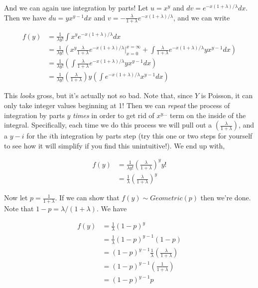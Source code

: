\documentclass[
  letterpaper,
  DIV=11,
  numbers=noendperiod]{scrreprt}
\begin{document}
And we can again use integration by parts! Let \(u = x^y\) and
\(dv = e^{-x(1 + \lambda)/\lambda} dx\). Then we have
\(du = yx^{y-1} dx\) and
\(v = -\frac{\lambda}{1 + \lambda}e^{-x(1 + \lambda)/\lambda}\), and we
can write

\begin{align*}
    f(y) & = \frac{1}{\lambda y!} \int x^y e^{-x(1 + \lambda)/\lambda} dx \\
    & = \frac{1}{\lambda y!} \left( x^y \frac{\lambda}{1 + \lambda}e^{-x(1 + \lambda)/\lambda} \bigg|_{x = 0}^{x = \infty}  + \int \frac{\lambda}{1 + \lambda}e^{-x(1 + \lambda)/\lambda} yx^{y-1} dx\right) \\
    & = \frac{1}{\lambda y!} \left(  \int \frac{\lambda}{1 + \lambda}e^{-x(1 + \lambda)/\lambda} yx^{y-1} dx \right) \\
    & = \frac{1}{\lambda y!} \left( \frac{\lambda }{1 + \lambda} \right) y \left(  \int e^{-x(1 + \lambda)/\lambda} x^{y-1} dx \right)
\end{align*}

This \emph{looks} gross, but it's actually not so bad. Note that, since
\(Y\) is Poisson, it can only take integer values beginning at 1! Then
we can \emph{repeat} the process of integration by parts \(y\)
\emph{times} in order to get rid of \(x^{y\dots}\) term on the inside of
the integral. Specifically, each time we do this process we will pull
out a \(\left( \frac{\lambda }{1 + \lambda} \right)\), and a \(y - i\)
for the \(i\)th integration by parts step (try this one or two steps for
yourself to see how it will simplify if you find this unintuitive!). We
end up with,

\begin{align*}
    f(y) & = \frac{1}{\lambda y!} \left( \frac{\lambda }{1 + \lambda} \right)^y y! \\
    & = \frac{1}{\lambda} \left(\frac{\lambda}{1 + \lambda}\right)^y
\end{align*}

Now let \(p = \frac{1}{1 + \lambda}\). If we can show that
\(f(y) \sim Geometric(p)\) then we're done. Note that
\(1 - p = \lambda/(1 + \lambda)\). We have

\begin{align*}
    f(y) & = \frac{1}{\lambda} (1 - p)^y \\
    & = \frac{1}{\lambda} (1 - p)^{y-1} (1-p) \\
    & = (1 - p)^{y-1} \frac{1}{\lambda} \left( \frac{\lambda}{1 + \lambda} \right) \\
    & = (1 - p)^{y-1} \left( \frac{1}{1 + \lambda} \right) \\
    & = (1 - p)^{y-1} p
\end{align*}
\end{document}
